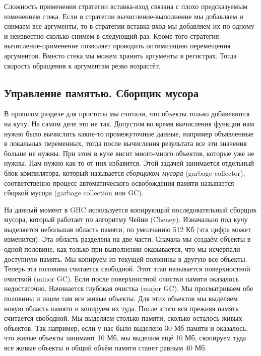Сложность применения стратегии вставка-вход связана
с плохо предсказуемым изменением стека. Если в стратегии вычисление-выполнение
мы добавляем и снимаем все аргументы, то в стратегии вставка-вход
мы добавляем их по одному и неизвестно сколько снимем в следующий раз.
Кроме того стратегия вычисление-применение позволяет проводить
оптимизацию перемещения аргументов. Вместо стека мы можем хранить
аргументы в регистрах. Тогда скорость обращения к аргументам
резко возрастёт. 

\subsection{Управление памятью. Сборщик мусора}

В прошлом разделе для простоты мы считали, что объекты только добавляются
на кучу. На самом деле это не так. Допустим во время вычисления функции
нам нужно было вычислить какие-то промежуточные данные, например
объявленные в локальных переменных, тогда после вычисления результата
все эти значения больше не нужны. При этом в куче висит
много-много объектов, которые уже не нужны. Нам нужно 
как-то от них избавится. Этой задачей занимается отдельный 
блок компилятора, который называется \emph{сборщиком мусора} 
(garbage collector), соответственно процесс автоматического
освобождения памяти называется сборкой мусора (garbage collection или GC).

На данный момент в GHC используется копирующий последовательный
сборщик мусора, который работает по алгоритму Чейни (Cheney). 
Изначально под кучу выделяется небольшая область памяти,
по умолчанию 512 Кб (эта цифра может изменится). 
Эта область разделена на две части. 
Сначала мы создаём объекты в одной половине, как только при
выполнении  оказывается, что мы исчерпали доступную память.
Мы копируем из текущей половины в другую все  объекты.
Теперь эта половина считается свободной. Этот этап называется
поверхностной очисткой (minor GC). Если после поверхностной
очистки памяти оказалось недостаточно. Начинается 
глубокая очистка (major GC).
Мы просматриваем обе половины и ищем там все живые объекты.
Для этих объектов мы выделяем новую область памяти и 
копируем их туда. После этого вся прежняя память считается свободной.
Мы выделяем столько памяти, сколько осталось живых объектов. 
Так например, если у нас было выделено 30 Мб памяти и оказалось,
что живые объекты занимают 10 Мб, мы выделим ещё 10 Мб, скопируем
туда все живые объекты и общий объём памяти станет равным 40 Мб.

